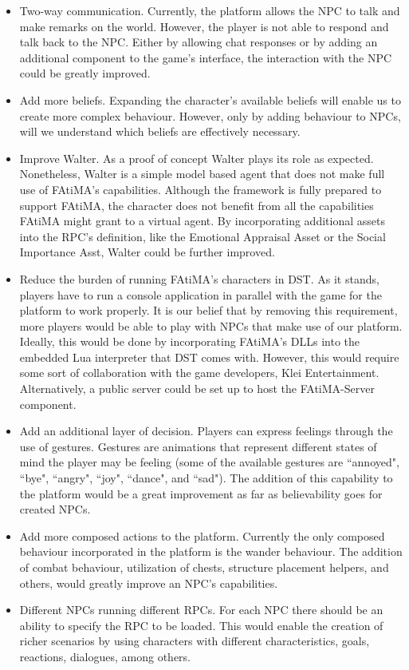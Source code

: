 \begin{itemize}
\item Two-way communication.
Currently, the platform allows the NPC to talk and make remarks on the world.
However, the player is not able to respond and talk back to the NPC.
Either by allowing chat responses or by adding an additional component to the game's interface, the interaction with the NPC could be greatly improved.

\item Add more beliefs.
Expanding the character's available beliefs will enable us to create more complex behaviour.
However, only by adding behaviour to NPCs, will we understand which beliefs are effectively necessary.

\item Improve Walter.
As a proof of concept Walter plays its role as expected.
Nonetheless, Walter is a simple model based agent that does not make full use of FAtiMA's capabilities.
Although the framework is fully prepared to support FAtiMA, the character does not benefit from all the capabilities FAtiMA might grant to a virtual agent. By incorporating additional assets into the RPC's definition, like the Emotional Appraisal Asset or the Social Importance Asst, Walter could be further improved.

\item Reduce the burden of running FAtiMA's characters in DST.
As it stands, players have to run a console application in parallel with the game for the platform to work properly.
It is our belief that by removing this requirement, more players would be able to play with NPCs that make use of our platform.
Ideally, this would be done by incorporating FAtiMA's DLLs into the embedded Lua interpreter that DST comes with.
However, this would require some sort of collaboration with the game developers, Klei Entertainment.
Alternatively, a public server could be set up to host the FAtiMA-Server component.

\item Add an additional layer of decision.
Players can express feelings through the use of gestures.
Gestures are animations that represent different states of mind the player may be feeling (some of the available gestures are ``annoyed", ``bye", ``angry", ``joy", ``dance", and ``sad").
The addition of this capability to the platform would be a great improvement as far as believability goes for created NPCs.

\item Add more composed actions to the platform.
Currently the only composed behaviour incorporated in the platform is the wander behaviour.
The addition of combat behaviour, utilization of chests, structure placement helpers, and others, would greatly improve an NPC's capabilities.

\item Different NPCs running different RPCs.
For each NPC there should be an ability to specify the RPC to be loaded.
This would enable the creation of richer scenarios by using characters with different characteristics, goals, reactions, dialogues, among others.

\end{itemize}
